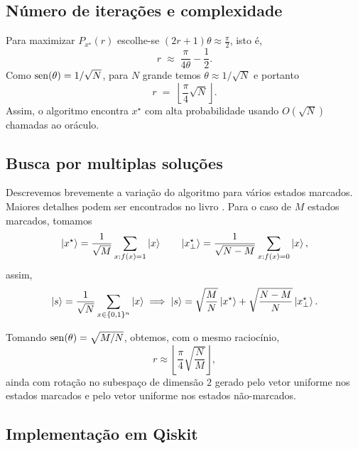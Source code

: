 \subsection{Número de iterações e complexidade}
Para maximizar $P_{x^\star}(r)$ escolhe-se $(2r+1)\theta \approx \frac{\pi}{2}$, isto é,
\begin{equation}\label{eq:goittheta}
r \;\approx\; \frac{\pi}{4\theta} - \frac{1}{2}.
\end{equation}
Como $\operatorname{sen}(\theta)=1/\sqrt{N}$, para $N$ grande temos $\theta \approx 1/\sqrt{N}$ e portanto
\begin{equation}
r \;=\; \left\lfloor \frac{\pi}{4}\sqrt{N}\right\rfloor.
\end{equation}
Assim, o algoritmo encontra $x^\star$ com alta probabilidade usando $O(\sqrt{N})$ chamadas ao oráculo.

\subsection{Busca por multiplas soluções}

Descrevemos brevemente a variação do algoritmo para vários estados marcados. Maiores detalhes podem ser encontrados no livro \cite[seção 6.1]{nielsen2010quantum}. Para o caso de $M$ estados marcados, tomamos
\begin{equation}
    \ket{x^\star} = \frac{1}{\sqrt{M}} \sum_{x:f(x)=1}\ket{x} \qquad \ket{x^\star_\perp} = \frac{1}{\sqrt{N-M}} \sum_{x:f(x)=0}\ket{x},
\end{equation}
assim,
\begin{equation}
    \ket{s} = \frac{1}{\sqrt{N}}\sum_{x\in \{0,1\}^n}\ket{x} \implies \ket{s} = \sqrt{\frac{M}{N}}\ket{x^\star} + \sqrt{\frac{N-M}{N}}\ket{x^\star_\perp}.
\end{equation}

Tomando $\operatorname{sen}(\theta)=\sqrt{M/N}$, obtemos, com o mesmo raciocínio,
\begin{equation}\label{eq:groverit}
r \approx \left\lfloor \frac{\pi}{4}\sqrt{\frac{N}{M}} \right\rfloor,    
\end{equation}
ainda com rotação no subespaço de dimensão $2$ gerado pelo vetor uniforme nos estados marcados e pelo vetor
uniforme nos estados não-marcados.

\subsection{Implementação em Qiskit}

